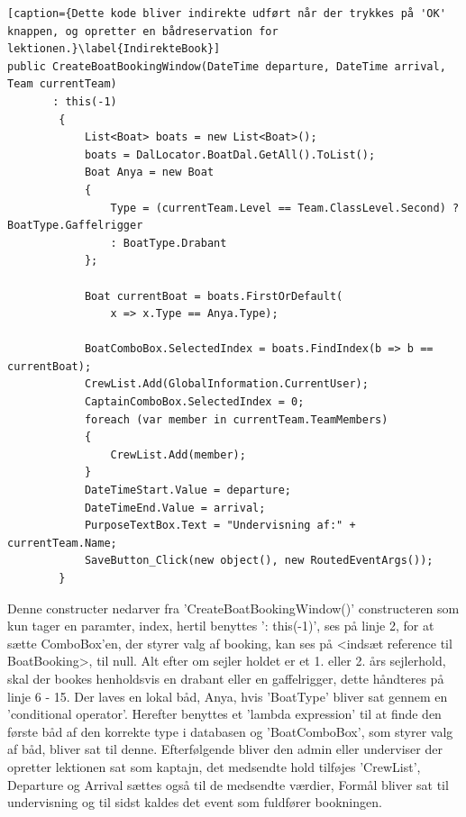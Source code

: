 \begin{lstlisting}[caption={Dette kode bliver indirekte udført når der trykkes på 'OK' knappen, og opretter en bådreservation for lektionen.}\label{IndirekteBook}]
public CreateBoatBookingWindow(DateTime departure, DateTime arrival, Team currentTeam) 
	   : this(-1)
        {
            List<Boat> boats = new List<Boat>();
            boats = DalLocator.BoatDal.GetAll().ToList();
            Boat Anya = new Boat
            {
                Type = (currentTeam.Level == Team.ClassLevel.Second) ? BoatType.Gaffelrigger 
                : BoatType.Drabant
            };

            Boat currentBoat = boats.FirstOrDefault(
                x => x.Type == Anya.Type);

            BoatComboBox.SelectedIndex = boats.FindIndex(b => b == currentBoat);
            CrewList.Add(GlobalInformation.CurrentUser);
            CaptainComboBox.SelectedIndex = 0;
            foreach (var member in currentTeam.TeamMembers)
            {
                CrewList.Add(member);
            }
            DateTimeStart.Value = departure;
            DateTimeEnd.Value = arrival;
            PurposeTextBox.Text = "Undervisning af:" + currentTeam.Name;
            SaveButton_Click(new object(), new RoutedEventArgs());
        }
\end{lstlisting}
Denne constructer nedarver fra 'CreateBoatBookingWindow()' constructeren som kun tager en paramter, index, hertil benyttes ': this(-1)', ses på linje 2, for at sætte ComboBox'en, der styrer valg af booking, kan ses på <indsæt reference til BoatBooking>, til null.
Alt efter om sejler holdet er et 1. eller 2. års sejlerhold, skal der bookes henholdsvis en drabant eller en gaffelrigger, dette håndteres på linje 6 - 15. Der laves en lokal båd, Anya, hvis 'BoatType' bliver sat gennem en 'conditional operator'.
Herefter benyttes et 'lambda expression' til at finde den første båd af den korrekte type i databasen og 'BoatComboBox', som styrer valg af båd, bliver sat til denne.
Efterfølgende bliver den admin eller underviser der opretter lektionen sat som kaptajn, det medsendte hold tilføjes 'CrewList', Departure og Arrival sættes også til de medsendte værdier, Formål bliver sat til undervisning og til sidst kaldes det event som fuldfører bookningen.